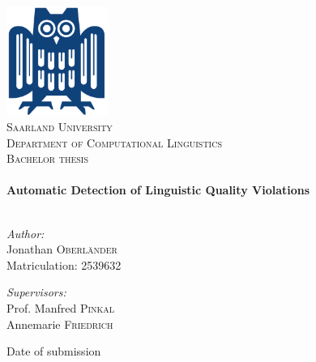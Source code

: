 \begin{titlepage}
\begin{center}

\includegraphics[width=0.25\textwidth]{./eule}~\\[1cm]

\textsc{\LARGE Saarland  University}\\[0.4cm]
\textsc{\Large Department of Computational Linguistics}\\[1.5cm]

\textsc{\Large Bachelor thesis}\\[0.5cm]


\HRule \\[1.0cm]

{ \huge \bfseries Automatic Detection of Linguistic Quality Violations}\\[0.4cm]

\HRule \\[1.5cm]

\begin{minipage}{0.4\textwidth}
\begin{flushleft} \large
\emph{Author:}\\
Jonathan \textsc{Oberländer}\\
Matriculation: 2539632
\end{flushleft}
\end{minipage}
\begin{minipage}{0.4\textwidth}
\begin{flushright} \large
\emph{Supervisors:} \\
Prof. Manfred \textsc{Pinkal}\\
Annemarie \textsc{Friedrich}\\
\end{flushright}
\end{minipage}

\vfill

{\large Date of submission}

\end{center}
\end{titlepage}
